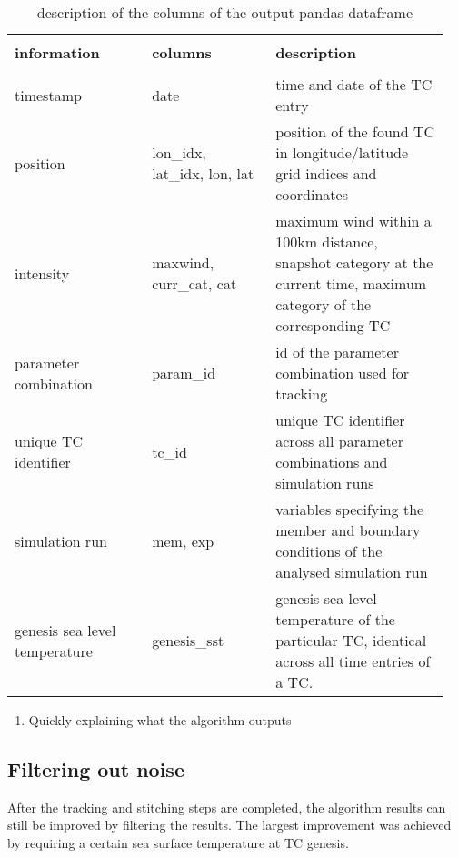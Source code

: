 \begingroup
\begin{table}[]
\centering
\begin{tabular}{| p{0.3\linewidth} | p{0.27\linewidth} | p{0.38\linewidth }|}
\hline
  &              &                                \\[-0.5em]
\textbf{information}  & \textbf{columns}             & \textbf{description}                                                                   \\[5pt] \hline
  &              &                                \\[-0.5em]
timestamp             & date                         & time and date of the TC entry                                                          \\[5pt]
position              & lon\_idx, lat\_idx, lon, lat & position of the found TC in longitude/latitude grid indices and coordinates            \\[5pt]
intensity &
  maxwind, curr\_cat, cat &
  maximum wind within a 100km distance, snapshot category at the current time, maximum category of the corresponding TC \\[5pt]
parameter combination & param\_id                    & id of the parameter combination used for tracking                                      \\[5pt]
unique TC identifier  & tc\_id                       & unique TC identifier across all parameter combinations and simulation runs             \\[5pt]
simulation run        & mem, exp                     & variables specifying the member and boundary conditions of the analysed simulation run \\[5pt]
genesis sea level temperature &
  genesis\_sst &
  genesis sea level temperature of the particular TC, identical across all time entries of a TC. \\[5pt] \hline
\end{tabular}
\caption{description of the columns of the output pandas dataframe}
\label{tab:output-data}
\end{table}
\endgroup


\begin{enumerate}
	\item Quickly explaining what the algorithm outputs
\end{enumerate}
\subsection{Filtering out noise}
After the tracking and stitching steps are completed, the algorithm results can
still be improved by filtering the results. The largest improvement was
achieved by requiring a certain sea surface temperature at TC genesis.
